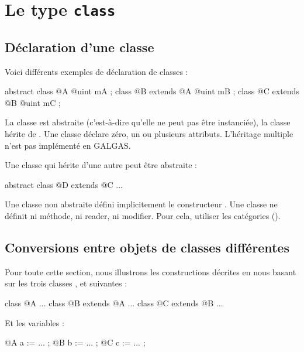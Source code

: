 
\chapter{Le type \texttt{class}}

\section{Déclaration d'une classe}

Voici différents exemples de déclaration de classes :

\begin{galgascode}
abstract class @A {
  @uint mA ;
}
class @B extends @A {
  @uint mB ;
}
class @C extends @B {
 @uint mC ;
}
\end{galgascode}

La classe  est abstraite (c'est-à-dire qu'elle ne peut pas être instanciée), la classe  hérite de . Une classe déclare zéro, un ou plusieurs attributs. L'héritage multiple n'est pas implémenté en GALGAS.

Une classe qui hérite d'une autre peut être abstraite :
\begin{galgascode}
abstract class @D extends @C {
  ...
 }
\end{galgascode}

Une classe non abstraite défini implicitement le constructeur . Une classe ne définit ni méthode, ni reader, ni modifier. Pour cela, utiliser les catégories ().


\section{Conversions entre objets de classes différentes}

Pour toute cette section, nous illustrons les constructions décrites en nous basant sur les trois classes ,  et  suivantes :

\begin{galgascode}
class @A { ... }
class @B extends @A { ... }
class @C extends @B { ... }
\end{galgascode}

Et les variables :

\begin{galgascode}
@A a := ... ;
@B b := ... ;
@C c := ... ;
\end{galgascode}

